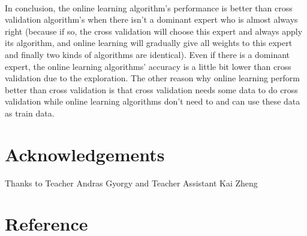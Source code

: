 \documentclass{gapd}
\begin{document}
\paragraph{}
	In conclusion, the online learning algorithm's performance is better than cross validation algorithm's when there isn't a dominant expert who is almost always right (because if so, the cross validation will choose this expert and always apply its algorithm, and online learning will gradually give all weights to this expert and finally two kinds of algorithms are identical). Even if there is a dominant expert, the online learning algorithms' accuracy is a little bit lower than cross validation due to the exploration. The other reason why online learning  perform better than cross validation is that cross validation needs some data to do cross validation while online learning algorithms don't need to and can use these data as train data. 
		


\section*{Acknowledgements}

Thanks to Teacher Andras Gyorgy and Teacher Assistant Kai Zheng

\section{Reference}

\end{document}
